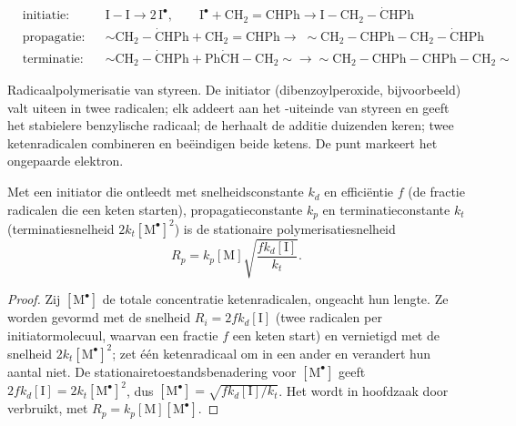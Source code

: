 \begin{omfigure}
\begin{align*}
&\text{initiatie:} && \mathrm{I{-}I} \longrightarrow 2\,\mathrm{I^{\bullet}}, \qquad
\mathrm{I^{\bullet} + CH_2{=}CHPh \longrightarrow I{-}CH_2{-}\dot{C}HPh} \\
&\text{propagatie:} && {\sim}\mathrm{CH_2{-}\dot{C}HPh + CH_2{=}CHPh \longrightarrow}\;
{\sim}\mathrm{CH_2{-}CHPh{-}CH_2{-}\dot{C}HPh} \\
&\text{terminatie:} && {\sim}\mathrm{CH_2{-}\dot{C}HPh + Ph\dot{C}H{-}CH_2}{\sim} \longrightarrow
{\sim}\mathrm{CH_2{-}CHPh{-}CHPh{-}CH_2}{\sim}
\end{align*}

{\small Radicaalpolymerisatie van styreen. De initiator  (dibenzoylperoxide, bijvoorbeeld)
valt uiteen in twee radicalen; elk addeert aan het -uiteinde van styreen en geeft het stabielere benzylische
radicaal; de  herhaalt de additie duizenden keren; twee ketenradicalen combineren en beëindigen beide
ketens. De punt markeert het ongepaarde elektron.}
\end{omfigure}

\begin{theorem}\label{thm:b2:polymer-synthesis:radical-rate}
Met een initiator die ontleedt met snelheidsconstante $k_d$ en efficiëntie $f$ (de fractie radicalen die
een keten starten), propagatieconstante $k_p$ en terminatieconstante $k_t$ (terminatiesnelheid $2k_t
[\mathrm{M^\bullet}]^2$) is de stationaire polymerisatiesnelheid
\begin{equation*}
R_p = k_p [\mathrm M] \sqrt{\frac{f k_d [\mathrm I]}{k_t}}.
\end{equation*}
\end{theorem}

\begin{proof}
Zij $[\mathrm{M^\bullet}]$ de totale concentratie ketenradicalen, ongeacht hun lengte. Ze worden
gevormd met de snelheid $R_i = 2fk_d[\mathrm I]$ (twee radicalen per initiatormolecuul, waarvan een fractie $f$
een keten start) en vernietigd met de snelheid $2k_t[\mathrm{M^\bullet}]^2$;  zet één ketenradicaal
om in een ander en verandert hun aantal niet. De stationairetoestandsbenadering voor
$[\mathrm{M^\bullet}]$ geeft $2fk_d[\mathrm I] = 2k_t[\mathrm{M^\bullet}]^2$, dus $[\mathrm{M^\bullet}] =
\sqrt{fk_d[\mathrm I]/k_t}$. Het  wordt in hoofdzaak door  verbruikt, met $R_p =
k_p[\mathrm M][\mathrm{M^\bullet}]$.
\end{proof}

